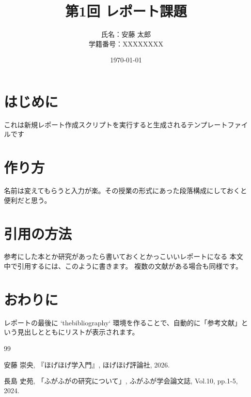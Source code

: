 \documentclass[a4paper,11pt]{ltjsarticle}
\title{第1回 レポート課題}
\author{氏名：安藤 太郎 \\ 学籍番号：XXXXXXXX}
\date{\today}
\begin{document}
\maketitle


\section{はじめに}
これは新規レポート作成スクリプトを実行すると生成されるテンプレートファイルです

\section{作り方}
名前は変えてもらうと入力が楽。その授業の形式にあった段落構成にしておくと便利だと思う。

\section{引用の方法}
参考にした本とか研究があったら書いておくとかっこいいレポートになる
本文中で引用するには、このように書きます\cite{book1}。
複数の文献がある場合も同様です\cite{paper1}。

\section{おわりに}
レポートの最後に `thebibliography` 環境を作ることで、自動的に「参考文献」という見出しとともにリストが表示されます。

\begin{thebibliography}{99}

    安藤 崇央, 『ほげほげ学入門』, ほげほげ評論社, 2026.

    長島 史苑, 「ふがふがの研究について」, ふがふが学会論文誌, Vol.10, pp.1-5, 2024.

\end{thebibliography}
\end{document}
